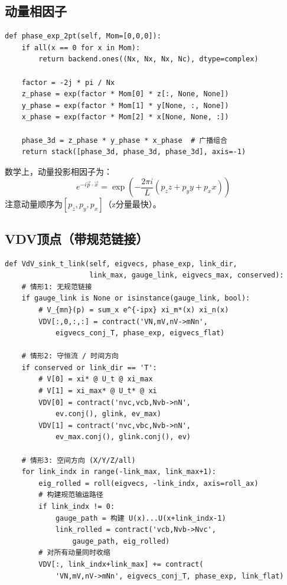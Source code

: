 \documentclass[11pt,a4paper]{ctexart}
\begin{document}
\subsection{动量相因子}

\begin{codebox}
\begin{lstlisting}[style=python]
def phase_exp_2pt(self, Mom=[0,0,0]):
    if all(x == 0 for x in Mom):
        return backend.ones((Nx, Nx, Nx, Nc), dtype=complex)

    factor = -2j * pi / Nx
    z_phase = exp(factor * Mom[0] * z[:, None, None])
    y_phase = exp(factor * Mom[1] * y[None, :, None])
    x_phase = exp(factor * Mom[2] * x[None, None, :])

    phase_3d = z_phase * y_phase * x_phase  # 广播组合
    return stack([phase_3d, phase_3d, phase_3d], axis=-1)
\end{lstlisting}
\end{codebox}

数学上，动量投影相因子为：
\begin{equation}
e^{-i\vec{p}\cdot\vec{x}} = \exp\left( -\frac{2\pi i}{L} (p_z z + p_y y + p_x x) \right)
\end{equation}
注意动量顺序为$[p_z, p_y, p_x]$（z分量最快）。

\subsection{VDV顶点（带规范链接）}

\begin{codebox}
\begin{lstlisting}[style=python]
def VdV_sink_t_link(self, eigvecs, phase_exp, link_dir,
                    link_max, gauge_link, eigvecs_max, conserved):
    # 情形1: 无规范链接
    if gauge_link is None or isinstance(gauge_link, bool):
        # V_{mn}(p) = sum_x e^{-ipx} xi_m*(x) xi_n(x)
        VDV[:,0,:,:] = contract('VN,mV,nV->mNn',
            eigvecs_conj_T, phase_exp, eigvecs_flat)

    # 情形2: 守恒流 / 时间方向
    if conserved or link_dir == 'T':
        # V[0] = xi* @ U_t @ xi_max
        # V[1] = xi_max* @ U_t* @ xi
        VDV[0] = contract('nvc,vcb,Nvb->nN',
            ev.conj(), glink, ev_max)
        VDV[1] = contract('nvc,vbc,Nvb->nN',
            ev_max.conj(), glink.conj(), ev)

    # 情形3: 空间方向 (X/Y/Z/all)
    for link_indx in range(-link_max, link_max+1):
        eig_rolled = roll(eigvecs, -link_indx, axis=roll_ax)
        # 构建规范输运路径
        if link_indx != 0:
            gauge_path = 构建 U(x)...U(x+link_indx-1)
            link_rolled = contract('vcb,Nvb->Nvc',
                gauge_path, eig_rolled)
        # 对所有动量同时收缩
        VDV[:, link_indx+link_max] += contract(
            'VN,mV,nV->mNn', eigvecs_conj_T, phase_exp, link_flat)
\end{lstlisting}
\end{codebox}
\end{document}
